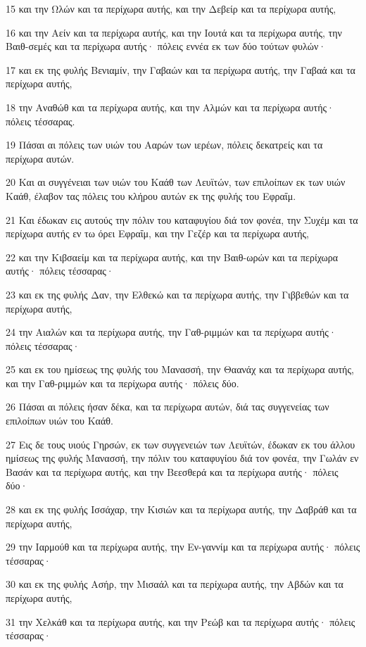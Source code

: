 \par 15 και την Ωλών και τα περίχωρα αυτής, και την Δεβείρ και τα περίχωρα αυτής,
\par 16 και την Αείν και τα περίχωρα αυτής, και την Ιουτά και τα περίχωρα αυτής, την Βαιθ-σεμές και τα περίχωρα αυτής· πόλεις εννέα εκ των δύο τούτων φυλών·
\par 17 και εκ της φυλής Βενιαμίν, την Γαβαών και τα περίχωρα αυτής, την Γαβαά και τα περίχωρα αυτής,
\par 18 την Αναθώθ και τα περίχωρα αυτής, και την Αλμών και τα περίχωρα αυτής· πόλεις τέσσαρας.
\par 19 Πάσαι αι πόλεις των υιών του Ααρών των ιερέων, πόλεις δεκατρείς και τα περίχωρα αυτών.
\par 20 Και αι συγγένειαι των υιών του Καάθ των Λευϊτών, των επιλοίπων εκ των υιών Καάθ, έλαβον τας πόλεις του κλήρου αυτών εκ της φυλής του Εφραΐμ.
\par 21 Και έδωκαν εις αυτούς την πόλιν του καταφυγίου διά τον φονέα, την Συχέμ και τα περίχωρα αυτής εν τω όρει Εφραΐμ, και την Γεζέρ και τα περίχωρα αυτής,
\par 22 και την Κιβσαείμ και τα περίχωρα αυτής, και την Βαιθ-ωρών και τα περίχωρα αυτής· πόλεις τέσσαρας·
\par 23 και εκ της φυλής Δαν, την Ελθεκώ και τα περίχωρα αυτής, την Γιββεθών και τα περίχωρα αυτής,
\par 24 την Αιαλών και τα περίχωρα αυτής, την Γαθ-ριμμών και τα περίχωρα αυτής· πόλεις τέσσαρας·
\par 25 και εκ του ημίσεως της φυλής του Μανασσή, την Θαανάχ και τα περίχωρα αυτής, και την Γαθ-ριμμών και τα περίχωρα αυτής· πόλεις δύο.
\par 26 Πάσαι αι πόλεις ήσαν δέκα, και τα περίχωρα αυτών, διά τας συγγενείας των επιλοίπων υιών του Καάθ.
\par 27 Εις δε τους υιούς Γηρσών, εκ των συγγενειών των Λευϊτών, έδωκαν εκ του άλλου ημίσεως της φυλής Μανασσή, την πόλιν του καταφυγίου διά τον φονέα, την Γωλάν εν Βασάν και τα περίχωρα αυτής, και την Βεεσθερά και τα περίχωρα αυτής· πόλεις δύο·
\par 28 και εκ της φυλής Ισσάχαρ, την Κισιών και τα περίχωρα αυτής, την Δαβράθ και τα περίχωρα αυτής,
\par 29 την Ιαρμούθ και τα περίχωρα αυτής, την Εν-γαννίμ και τα περίχωρα αυτής· πόλεις τέσσαρας·
\par 30 και εκ της φυλής Ασήρ, την Μισαάλ και τα περίχωρα αυτής, την Αβδών και τα περίχωρα αυτής,
\par 31 την Χελκάθ και τα περίχωρα αυτής, και την Ρεώβ και τα περίχωρα αυτής· πόλεις τέσσαρας·
